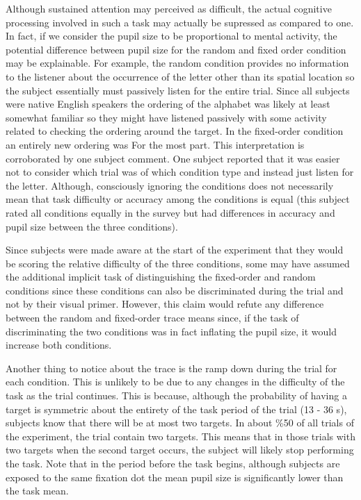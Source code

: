 \documentclass[10pt]{article}
\begin{document}
Although sustained
attention may perceived as difficult, the actual cognitive
processing involved in such a task may actually be supressed as
compared to one.  In fact, if we consider the pupil size to be
proportional to mental activity, the potential difference between
pupil size for the random and fixed order condition may be
explainable.  For example, the random condition provides no
information to the listener about the occurrence of the letter other
than its spatial location so the subject essentially must passively
listen for the entire trial.  Since all subjects were native English
speakers the ordering of the alphabet was likely at least somewhat
familiar so they might have listened passively with some activity
related to checking the ordering around the target.  In the
fixed-order condition an entirely new ordering was For the most
part.  This interpretation is corroborated by one subject comment.
One subject reported that it was easier not to consider which trial
was of which condition type and instead just listen for the letter.
Although, consciously ignoring the conditions does not necessarily
mean that task difficulty or accuracy among the conditions is equal
(this subject rated all conditions equally in the survey but had
differences in accuracy and pupil size between the three
conditions).

Since subjects were made aware at the start of the experiment that
they would be scoring the relative difficulty of the three
conditions, some may have assumed the additional implicit task of
distinguishing the fixed-order and random conditions since these
conditions can also be discriminated during the trial and not by
their visual primer.  However, this claim would refute any
difference between the random and fixed-order trace means since, if
the task of discriminating the two conditions was in fact inflating
the pupil size, it would increase both conditions. 

Another thing to notice about the trace is the ramp down during the
trial for each condition.  This is unlikely to be due to any changes in
the difficulty of the task as the trial continues. This is because, although
the probability of having a target is symmetric about the entirety of
the task period of the trial (13 - 36 s), subjects know that there will be at
most two targets.  In about \%50 of all trials of
the experiment, the trial contain two targets. This means that 
in those trials with two targets when the second target occurs, the subject will likely stop
performing the task.  Note that in the period before the task
begins, although subjects are exposed to the same fixation dot the
mean pupil size is significantly lower than the task mean.
\end{document}
